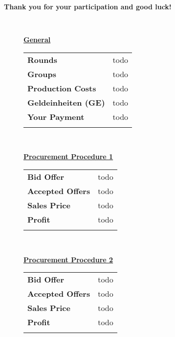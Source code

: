 \documentclass[11pt]{article}
\begin{document}
   \addvspace{1.5cm}
   
\textbf{Thank you for your participation and good luck!}
 
 
~\newpage

\begin{figure}[ht!] 
	\begin{minipage}[t]{1\linewidth} 
		\begin{tcolorbox}[arc=0pt,colframe=black!25]
			
			\textbf{\underline{General}} ~\bigskip

				\begin{tabular}{ll}
					\textbf{Rounds} 				& todo \\
					\textbf{Groups} 				& todo \\
					\textbf{Production Costs} 		& todo \\
					\textbf{Geldeinheiten (GE)} 	& todo \\
					\textbf{Your Payment} 			& todo \\
					\hspace{3.75cm}					& 	   \\					
				\end{tabular} ~\bigskip
			
			\textbf{\underline{Procurement Procedure 1}} ~\bigskip

				\begin{tabular}{ll}
					\textbf{Bid Offer} 				& todo \\
					\textbf{Accepted Offers} 		& todo \\
					\textbf{Sales Price} 			& todo \\
					\textbf{Profit}		 			& todo \\
					\hspace{3.75cm}					& 	   \\
				\end{tabular} ~\bigskip
		
			\textbf{\underline{Procurement Procedure 2}} ~\bigskip

				\begin{tabular}{ll}
					\textbf{Bid Offer} 				& todo \\
					\textbf{Accepted Offers} 		& todo \\
					\textbf{Sales Price}			& todo \\
					\textbf{Profit}		 			& todo \\
					\hspace{3.75cm}					& 	   \\
				\end{tabular} ~\bigskip
  
		\end{tcolorbox} 
	\end{minipage}  
\end{figure}


~\newpage


\end{document}
